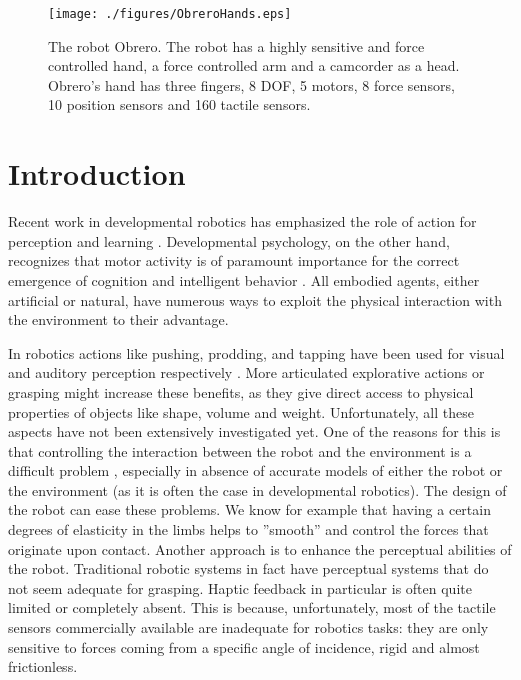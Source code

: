 \begin{figure}[tbp]
\centerline{
\texttt{[image: ./figures/ObreroHands.eps]}
} \caption{The robot Obrero. The robot has a highly sensitive and
force controlled hand, a force controlled arm and a
camcorder as a head. Obrero's hand  has three fingers, 8 DOF, 5
motors, 8 force sensors, 10 position sensors and 160 tactile
sensors.} \label{fig:RobotObrero}
\end{figure}
%
\section{Introduction}
%
Recent work in developmental robotics has emphasized the role of
action for perception and learning
\cite{metta03early,natale04learning,natale05from}. Developmental
psychology, on the other hand, recognizes that motor activity is of
paramount importance for the correct emergence of cognition and
intelligent behavior \cite{gibson88explore,streri93Seeing,bushnell93motor,hofsten04motor}.
All embodied agents, either artificial or natural, have numerous ways
to exploit the physical interaction with the environment to their
advantage. 

In robotics actions like pushing, prodding, and tapping
have been used for visual and auditory perception respectively
\cite{metta03early,etorresjara05tapping}. More articulated
explorative actions or grasping might increase these benefits, as
they give direct access to physical properties of objects like
shape, volume and weight.
%
Unfortunately, all these aspects have not been extensively
investigated yet. One of the reasons for this is that controlling
the interaction between the robot and the environment is a
difficult problem \cite{volpe90real}, especially in absence of
accurate models of either the robot or the environment (as it is
often the case in developmental robotics).
%
The design of the robot can ease these problems. We know for
example that having a certain degrees of elasticity in the limbs
helps to ''smooth''  and control the forces that originate upon
contact. Another approach is to enhance the perceptual abilities
of the robot. Traditional robotic systems in fact have perceptual
systems that do not seem adequate for grasping. Haptic feedback in
particular is often quite limited or completely absent. This is
because, unfortunately, most of the tactile sensors commercially
available are inadequate for robotics tasks: they are only
sensitive to forces coming from a specific angle of incidence,
rigid and almost frictionless.

